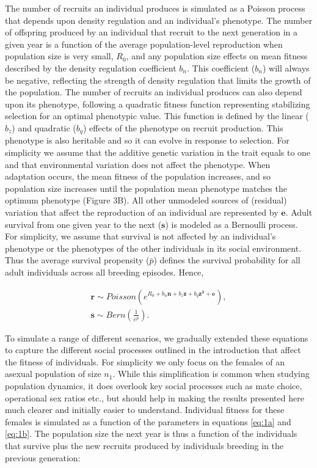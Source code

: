 \documentclass{article}
\begin{document}
The number of recruits an individual produces is simulated as a Poisson process that depends upon density regulation and an individual's phenotype. The number of offspring produced by an individual that recruit to the next generation in a given year is a function of the average population-level reproduction when population size is very small, $R_0$, and any population size effects on mean fitness described by the density regulation coefficient $b_{n}$. This coefficient ($b_{n}$) will always be negative, reflecting the strength of density regulation that limits the growth of the population. The number of recruits an individual produces can also depend upon its phenotype, following a quadratic fitness function representing stabilizing selection for an optimal phenotypic value. This function is defined by the linear ($b_z$) and quadratic ($b_q$) effects of the phenotype on recruit production. This phenotype is also heritable and so it can evolve in response to selection. For simplicity we assume that the additive genetic variation in the trait equals to one and that environmental variation does not affect the phenotype. When adaptation occurs, the mean fitness of the population increases, and so population size increases until the population mean phenotype matches the optimum phenotype (Figure 3B). All other unmodeled sources of (residual) variation that affect the reproduction of an individual are represented by $\mathbf{e}$. Adult survival from one given year to the next ($\mathbf{s}$) is modeled as a Bernoulli process. For simplicity, we assume that survival is not affected by an individual's phenotype or the phenotypes of the other individuals in its social environment. Thus the average survival propensity ($\bar{p}$) defines the survival probability for all adult individuals across all breeding episodes. Hence,

\begin{subequations} 
\begin{gather}
\mathbf{r}\sim Poisson(e^{R_{0} + b_{n} \mathbf{n} + b_{z} \mathbf{z} + b_{q} \mathbf{z^2} + \mathbf{e}}), \label{eq:1a} \\
\mathbf{s}\sim Bern(\frac{1}{e^{\bar{p}}}). \label{eq:1b}
\end{gather}
\end{subequations}

To simulate a range of different scenarios, we gradually extended these equations to capture the different social processes outlined in the introduction that affect the fitness of individuals. For simplicity we only focus on the females of an asexual population of size $n_{1}$. While this simplification is common when studying population dynamics, it does overlook key social processes such as mate choice, operational sex ratios etc., but should help in making the results presented here much clearer and initially easier to understand. Individual fitness for these females is simulated as a function of the parameters in equations \ref{eq:1a} and \ref{eq:1b}. The population size the next year is thus a function of the individuals that survive plus the new recruits produced by individuals breeding in the previous generation:
\end{document}
